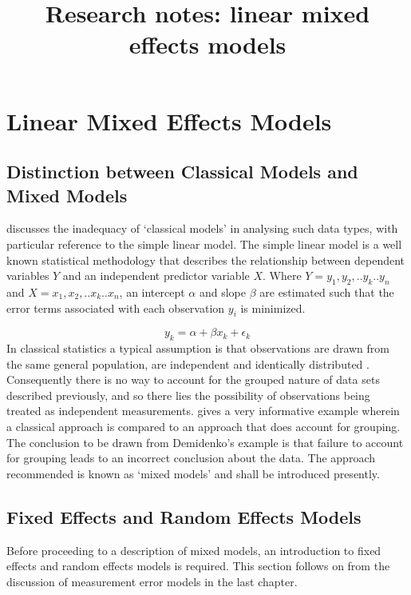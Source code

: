 \documentclass[12pt, a4paper]{report}
\title{Research notes: linear mixed effects models}
\author{ } \date{ }
\theoremstyle{plain}
\theoremstyle{definition}
\theoremstyle{remark}
\begin{document}
	\tableofcontents
\chapter{Linear Mixed Effects Models}

\section{Distinction between Classical Models and Mixed Models}
\citet{Demi} discusses the inadequacy of `classical models' in
analysing such data types, with particular reference to the simple
linear model. The simple linear model is a well known statistical
methodology that describes the relationship between dependent
variables $Y$ and an independent predictor variable $X$. Where
$Y={y_{1},y_{2},..y_{k}..y_{n}}$ and
$X={x_{1},x_{2},..x_{k}..x_{n}}$, an intercept $\alpha$ and slope
$\beta$ are estimated such that the error terms associated with
each observation $y_{i}$ is minimized.

\begin{equation}
y_{k} = \alpha + \beta x_{k}+ \epsilon_{k}
\end{equation}
In classical statistics a typical assumption is that observations
are drawn from the same general population, are independent and
identically distributed \citep{Demi}. Consequently there is no way
to account for the grouped nature of data sets described
previously, and so there lies the possibility of observations
being treated as independent measurements. \citet[pg.3]{Demi}
gives a very informative example wherein a classical approach is
compared to an approach that does account for grouping. The
conclusion to be drawn from Demidenko's example is that failure to
account for grouping leads to an incorrect conclusion about the
data. The approach recommended is known as `mixed models' and
shall be introduced presently.

\section{Fixed Effects and Random Effects Models}
Before proceeding to a description of mixed models, an
introduction to fixed effects and random effects models is
required. This section follows on from the discussion of
measurement error models in the last chapter.
\end{document}
